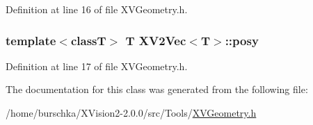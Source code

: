 Definition at line 16 of file XVGeometry.h.\label{XV2Vec_n1}
\hypertarget{class_XV2Vec_n1}{
\subsubsection[posy]{\setlength{\rightskip}{0pt plus 5cm}template$<$classT$>$ T XV2Vec$<$T$>$::posy}}




Definition at line 17 of file XVGeometry.h.

The documentation for this class was generated from the following file:\begin{CompactItemize}
\item 
/home/burschka/XVision2-2.0.0/src/Tools/\hyperlink{XVGeometry.h-source}{XVGeometry.h}\end{CompactItemize}
